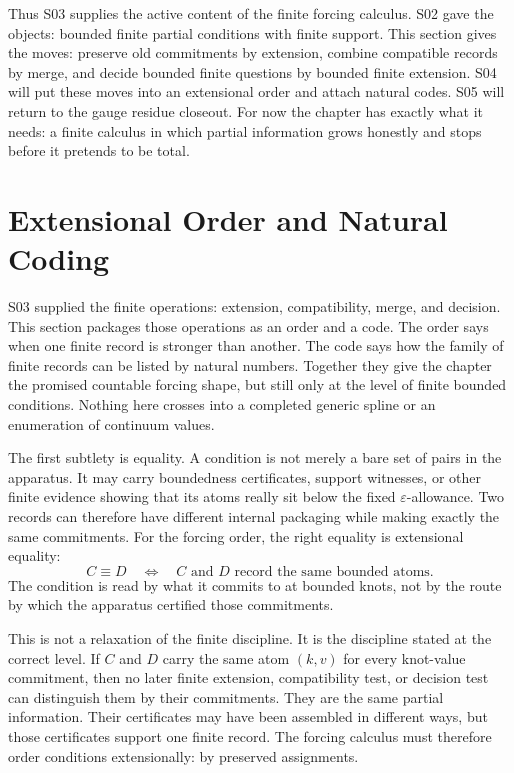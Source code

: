 Thus S03 supplies the active content of the finite forcing calculus. S02 gave
the objects: bounded finite partial conditions with finite support. This
section gives the moves: preserve old commitments by extension, combine
compatible records by merge, and decide bounded finite questions by bounded
finite extension. S04 will put these moves into an extensional order and attach
natural codes. S05 will return to the gauge residue closeout. For now the
chapter has exactly what it needs: a finite calculus in which partial
information grows honestly and stops before it pretends to be total.

\section{Extensional Order and Natural Coding}

S03 supplied the finite operations: extension, compatibility, merge, and
decision. This section packages those operations as an order and a code. The
order says when one finite record is stronger than another. The code says how
the family of finite records can be listed by natural numbers. Together they
give the chapter the promised countable forcing shape, but still only at the
level of finite bounded conditions. Nothing here crosses into a completed
generic spline or an enumeration of continuum values.

The first subtlety is equality. A condition is not merely a bare set of pairs in
the apparatus. It may carry boundedness certificates, support witnesses, or
other finite evidence showing that its atoms really sit below the fixed
\(\varepsilon\)-allowance. Two records can therefore have different internal
packaging while making exactly the same commitments. For the forcing order, the
right equality is extensional equality:
\[
  C \equiv D
  \quad\Longleftrightarrow\quad
  \text{\(C\) and \(D\) record the same bounded atoms.}
\]
The condition is read by what it commits to at bounded knots, not by the route
by which the apparatus certified those commitments.

This is not a relaxation of the finite discipline. It is the discipline stated
at the correct level. If \(C\) and \(D\) carry the same atom \((k,v)\) for
every knot-value commitment, then no later finite extension, compatibility
test, or decision test can distinguish them by their commitments. They are the
same partial information. Their certificates may have been assembled in
different ways, but those certificates support one finite record. The forcing
calculus must therefore order conditions extensionally: by preserved
assignments.

